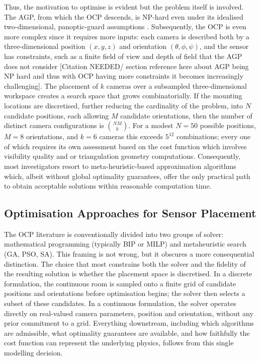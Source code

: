 Thus, the motivation to optimise is evident but the problem itself is involved. The \gls{AGP}, from which the \gls{OCP} descends, is NP-hard even under its idealised two-dimensional, panoptic-guard assumptions \parencite{kirchhofOptimalPlacementMultiple2013}. Subsequently, the \gls{OCP} is even more complex since it requires more inputs: each camera is described both by a three-dimensional position $(x,y,z)$ and orientation $(\theta, \phi, \psi)$, and the sensor has constraints, such as a finite field of view and depth of field that the \gls{AGP} does not consider [Citation NEEDED/ section reference here about AGP being NP hard and thus with OCP having more constraints it becomes increasingly challenging]. The placement of $k$ cameras over a subsampled three-dimensional workspace creates a search space that grows combinatorially. If the mounting locations are discretised, further reducing the cardinality of the problem, into $N$ candidate positions, each allowing $M$ candidate orientations, then the number of distinct camera configurations is $\binom{NM}{k}$. For a modest $N=50$ possible positions, $M= 8$ orientations, and $k=6$ cameras this exceeds $5^{12}$ combinations; every one of which requires its own assessment based on the cost function which involves visibility quality and or triangulation geometry computations. Consequently, most investigators resort to meta-heuristic-based approximation algorithms which, albeit without global optimality guarantees, offer the only practical path to obtain acceptable solutions within reasonable computation time.

\subsection{Optimisation Approaches for Sensor Placement}
\label{sec:lit-review-approaches}
The \gls{OCP} literature is conventionally divided into two groups of solver: mathematical programming (typically \gls{BIP} or \gls{MILP}) and metaheuristic search (\gls{GA}, \gls{PSO}, \gls{SA}). This framing is not wrong, but it obscures a more consequential distinction. The choice that most constrains both the solver and the fidelity of the resulting solution is whether the placement space is discretised. In a discrete formulation, the continuous room is sampled onto a finite grid of candidate positions and orientations before optimisation begins; the solver then selects a subset of these candidates. In a continuous formulation, the solver operates directly on real-valued camera parameters, position and orientation, without any prior commitment to a grid. Everything downstream, including which algorithms are admissible, what optimality guarantees are available, and how faithfully the cost function can represent the underlying physics, follows from this single modelling decision.

